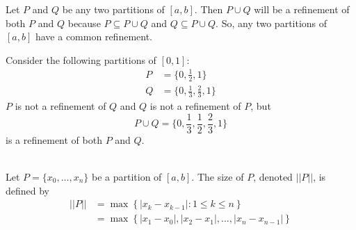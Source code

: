 \begin{remark}
    Let $P$ and $Q$ be any two partitions of $[a,b]$. Then $P \cup Q$ will be a refinement of both $P$ and $Q$ because $P \subseteq P \cup Q$ and $Q \subseteq P \cup Q$. So, any two partitions of $[a,b]$ have a common refinement.
\end{remark}

\begin{example}
    Consider the following partitions of $[0,1]$:
    \begin{align*}
        P&=\{0, \frac{1}{2}, 1\} \\
        Q&= \{0, \frac{1}{3}, \frac{2}{3}, 1\}
    \end{align*}
    $P$ is not a refinement of $Q$ and $Q$ is not a refinement of $P$, but 
    $$
    P\cup Q = \{0, \frac{1}{3}, \frac{1}{2}, \frac{2}{3}, 1\}
    $$
    is a refinement of both $P$ and $Q$.
\end{example}

\begin{definition} \leavevmode\\
    Let $P=\{x_0, ..., x_n\}$ be a partition of $[a,b]$. The size of $P$, denoted $||P||$, is defined by 
    \begin{align*}
        ||P|| &= \max \left\{|x_k - x_{k-1}| : 1 \leq k \leq n\right\} \\
        &= \max \left\{|x_1 - x_0|, |x_2 - x_1|, ..., |x_n - x_{n-1}|\right\}
    \end{align*}
\end{definition}